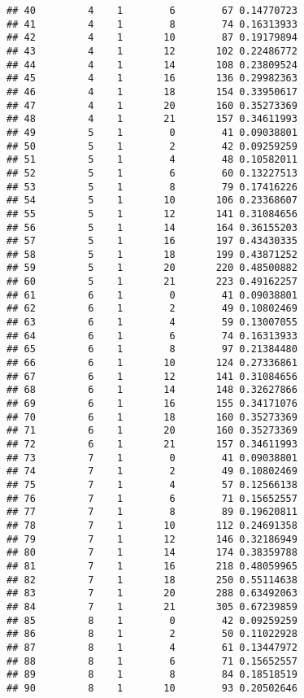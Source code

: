 \documentclass[
]{article}
\begin{document}
\begin{verbatim}
## 40         4    1        6        67 0.14770723
## 41         4    1        8        74 0.16313933
## 42         4    1       10        87 0.19179894
## 43         4    1       12       102 0.22486772
## 44         4    1       14       108 0.23809524
## 45         4    1       16       136 0.29982363
## 46         4    1       18       154 0.33950617
## 47         4    1       20       160 0.35273369
## 48         4    1       21       157 0.34611993
## 49         5    1        0        41 0.09038801
## 50         5    1        2        42 0.09259259
## 51         5    1        4        48 0.10582011
## 52         5    1        6        60 0.13227513
## 53         5    1        8        79 0.17416226
## 54         5    1       10       106 0.23368607
## 55         5    1       12       141 0.31084656
## 56         5    1       14       164 0.36155203
## 57         5    1       16       197 0.43430335
## 58         5    1       18       199 0.43871252
## 59         5    1       20       220 0.48500882
## 60         5    1       21       223 0.49162257
## 61         6    1        0        41 0.09038801
## 62         6    1        2        49 0.10802469
## 63         6    1        4        59 0.13007055
## 64         6    1        6        74 0.16313933
## 65         6    1        8        97 0.21384480
## 66         6    1       10       124 0.27336861
## 67         6    1       12       141 0.31084656
## 68         6    1       14       148 0.32627866
## 69         6    1       16       155 0.34171076
## 70         6    1       18       160 0.35273369
## 71         6    1       20       160 0.35273369
## 72         6    1       21       157 0.34611993
## 73         7    1        0        41 0.09038801
## 74         7    1        2        49 0.10802469
## 75         7    1        4        57 0.12566138
## 76         7    1        6        71 0.15652557
## 77         7    1        8        89 0.19620811
## 78         7    1       10       112 0.24691358
## 79         7    1       12       146 0.32186949
## 80         7    1       14       174 0.38359788
## 81         7    1       16       218 0.48059965
## 82         7    1       18       250 0.55114638
## 83         7    1       20       288 0.63492063
## 84         7    1       21       305 0.67239859
## 85         8    1        0        42 0.09259259
## 86         8    1        2        50 0.11022928
## 87         8    1        4        61 0.13447972
## 88         8    1        6        71 0.15652557
## 89         8    1        8        84 0.18518519
## 90         8    1       10        93 0.20502646

\end{verbatim}
\end{document}
